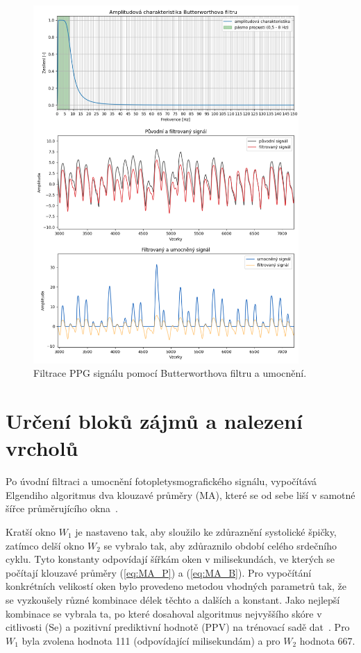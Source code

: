 \begin{figure}[h]
	\centering
	\includegraphics[width=0.9\textwidth]{./obrazky/ElgendiAFC_PP_Sq.png}
	\vspace{-4mm}
	\caption[Elgendiho předzpracování PPG signálu]{Filtrace PPG signálu pomocí Butterworthova filtru a umocnění.}
	\vspace{-15mm}
	\label{fig:filter-example}
\end{figure}

\section{Určení bloků zájmů a nalezení vrcholů}
\label{sec:thr_peaks}

Po úvodní filtraci a umocnění fotopletysmografického signálu, vypočítává Elgendiho algoritmus dva klouzavé průměry (\acs{MA}), které se od sebe liší v samotné šířce průměrujícího okna~\cite{Elgendi2013}.

Kratší okno \(W_1\) je nastaveno tak, aby sloužilo ke zdůraznění systolické špičky, zatímco delší okno \(W_2\) se vybralo tak, aby zdůraznilo období celého srdečního cyklu.
Tyto konstanty odpovídají šířkám oken v milisekundách, ve kterých se počítají klouzavé průměry (\ref{eq:MA_P}) a (\ref{eq:MA_B}).
Pro vypočítání konkrétních velikostí oken bylo provedeno metodou  vhodných parametrů tak, že se vyzkoušely různé kombinace délek těchto a dalších a konstant.
Jako nejlepší kombinace se vybrala ta, po které dosahoval algoritmus nejvyššího skóre v citlivosti (\acs{Se}) a pozitivní prediktivní hodnotě (\acs{PPV}) na trénovací sadě dat~\cite{Elgendi2013}.
Pro \(W_1\) byla zvolena hodnota 111 (odpovídající milisekundám) a pro \(W_2\) hodnota 667.

